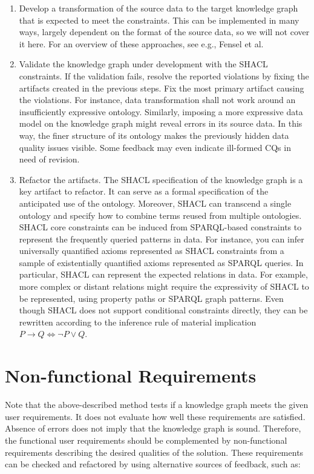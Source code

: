 \documentclass[
]{ceurart}
\begin{document}
\begin{enumerate}
    \item Develop a transformation of the source data to the target knowledge graph that is expected to meet the constraints. This can be implemented in many ways, largely dependent on the format of the source data, so we will not cover it here. For an overview of these approaches, see e.g., Fensel et al. \cite{Fensel2020b}
    \item Validate the knowledge graph under development with the SHACL constraints. If the validation fails, resolve the reported violations by fixing the artifacts created in the previous steps. Fix the most primary artifact causing the violations. For instance, data transformation shall not work around an insufficiently expressive ontology. Similarly, imposing a more expressive data model on the knowledge graph might reveal errors in its source data. In this way, the finer structure of its ontology makes the previously hidden data quality issues visible. Some feedback may even indicate ill-formed CQs in need of revision.
    \item Refactor the artifacts. The SHACL specification of the knowledge graph is a key artifact to refactor. It can serve as a formal specification of the anticipated use of the ontology. Moreover, SHACL can transcend a single ontology and specify how to combine terms reused from multiple ontologies. SHACL core constraints can be induced from SPARQL-based constraints to represent the frequently queried patterns in data. For instance, you can infer universally quantified axioms represented as SHACL constraints from a sample of existentially quantified axioms represented as SPARQL queries. In particular, SHACL can represent the expected relations in data. For example, more complex or distant relations might require the expressivity of SHACL to be represented, using property paths or SPARQL graph patterns. Even though SHACL does not support conditional constraints directly, they can be rewritten according to the inference rule of material implication ${P\to Q\Leftrightarrow \neg P\lor Q}$.
\end{enumerate}

\section{Non-functional Requirements}
Note that the above-described method tests if a knowledge graph meets the given user requirements. It does not evaluate how well these requirements are satisfied. Absence of errors does not imply that the knowledge graph is sound. Therefore, the functional user requirements should be complemented by non-functional requirements describing the desired qualities of the solution. These requirements can be checked and refactored by using alternative sources of feedback, such as:
\end{document}

